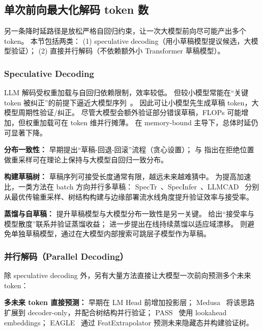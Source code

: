 \subsection{单次前向最大化解码 token 数}
\label{fixedparameter}

另一条降时延路径是放松严格自回归约束，让一次大模型前向尽可能产出多个 token。
本节包括两类：
(1) speculative decoding（用小草稿模型提议候选，大模型验证）；
(2) 直接并行解码（不依赖额外小 Transformer 草稿模型）。

\subsubsection{Speculative Decoding}
\label{specdec}

LLM 解码受权重加载与自回归依赖限制，效率较低。
但较小模型常能在“关键 token 被纠正”的前提下逼近大模型序列~\cite{kim2023speculative}。
因此可让小模型先生成草稿 token，大模型周期性验证/纠正。
尽管大模型会额外验证部分错误草稿，FLOPs 可能增加，但权重加载可在 token 维并行摊薄。
在 memory-bound 主导下，总体时延仍可显著下降。

\textbf{分布一致性：}
\cite{kim2023speculative} 早期提出“草稿-回退-回滚”流程（贪心设置）；
\cite{leviathan2023fast} 与 \cite{chen2023accelerating} 指出在拒绝位置做重采样可在理论上保持与大模型自回归一致分布。

\textbf{构建草稿树：}
草稿序列可接受长度通常有限，越远未来越难猜中。
为提高加速比，一类方法在 batch 方向并行多草稿：
SpecTr~\cite{sun2023spectr}、SpecInfer~\cite{miao2023specinfer}、LLMCAD~\cite{xu2023llmcad} 分别从最优传输重采样、树结构构建与边缘部署流水线角度提升验证效率与接受率。

\textbf{蒸馏与自草稿：}
提升草稿模型与大模型分布一致性是另一关键。
\cite{zhou2023distillspec} 给出“接受率与模型散度”联系并验证蒸馏收益；\cite{liu2023online} 进一步提出在线持续蒸馏以适应域漂移。
\cite{zhang2023draft} 则避免单独草稿模型，通过在大模型内部搜索可跳层子模型作为草稿。

\subsubsection{并行解码（Parallel Decoding）}
\label{pd}

除 speculative decoding 外，另有大量方法直接让大模型一次前向预测多个未来 token：

\textbf{多未来 token 直接预测：}
\cite{stern2018blockwise} 早期在 LM Head 前增加投影层；
Medusa~\cite{cai2024medusa} 将该思路扩展到 decoder-only，并配合树结构并行验证；
PASS~\cite{monea2023pass} 使用 lookahead embeddings；
EAGLE~\cite{li2024eagle} 通过 FeatExtrapolator 预测未来隐藏态并构建验证树。

